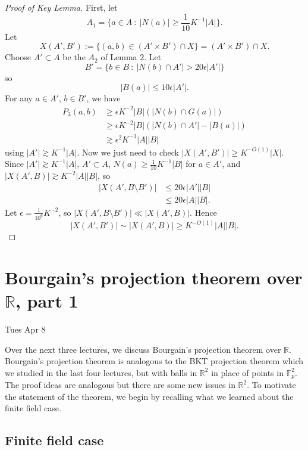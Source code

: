 \documentclass[12pt]{amsart}
\newcommand{\FF}{\mathbb{F}}
\newcommand{\RR}{\mathbb{R}}
\begin{document}
\begin{proof}[Proof of Key Lemma]
    First, let
    \[
        A_1 = \{ a \in A \ : \ |N(a)| \geq \frac{1}{10} K^{-1} |A| \}.
    \]
    Let
    \[
        X(A', B') := \{ (a, b) \in (A' \times B') \cap X \} = (A' \times B') \cap X.
    \]
    Choose $A' \subset A$ be the $A_2$ of Lemma 2. Let
    \[
        B' = \{ b \in B \ : \ |N(b) \cap A'| > 20\epsilon |A'| \}
    \]
    so
    \[
        |B(a)| \leq 10\epsilon |A'|.
    \]
    For any $a \in A'$, $b \in B'$, we have
    \begin{align*}
        P_3(a, b) & \geq \epsilon K^{-2} |B| (|N(b) \cap G(a)|) \\
        & \geq \epsilon K^{-2} |B| (|N(b) \cap A'| - |B(a)|) \\
        & \gtrsim \epsilon^2 K^{-3} |A||B|
    \end{align*}
    using $|A'| \gtrsim K^{-1}|A|$. Now we just need to check $|X(A', B')| \geq K^{-O(1)}|X|$. Since $|A'| \gtrsim K^{-1} |A|$, $A' \subset A$, $N(a) \geq \frac{1}{10} K^{-1} |B|$ for $a \in A'$, and $|X(A', B)| \gtrsim K^{-2} |A||B|$, so
    \begin{align*}
        |X(A', B \setminus B')| & \leq 20\epsilon |A'||B| \\
        & \leq 20\epsilon |A||B|.
    \end{align*}
    Let $\epsilon = \frac{1}{10^6} K^{-2}$, so $|X(A', B \setminus B')| \ll |X(A', B)|$. Hence
    \[
        |X(A', B')| \sim |X(A', B)| \geq K^{-O(1)} |A||B|.
    \]
\end{proof}


\newpage


\section{Bourgain's projection theorem over $\RR$, part 1}


Tues Apr 8

Over the next three lectures,  we discuss Bourgain's projection theorem over $\RR$.   Bourgain's projection theorem is analogous to the BKT projection theorem which we studied in the last four lectures,  but with balls in  $\RR^2$ in place of points in $\FF_p^2$.    The proof ideas are analogous but there are some new issues in $\RR^2$.   To motivate the statement of the theorem,  we begin by recalling what we learned about the finite field case.

\subsection{Finite field case}
\end{document}
